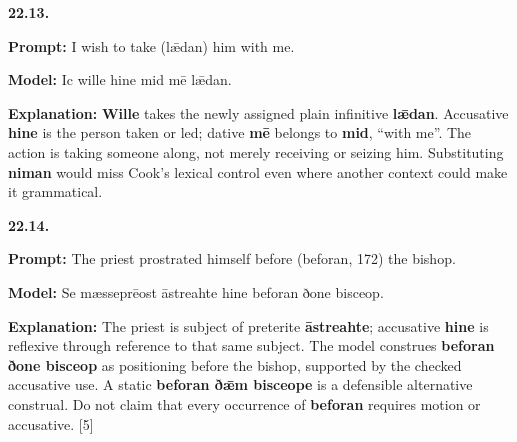\par\begin{minipage}{\linewidth}\raggedright
\textbf{22.13.}

\textbf{Prompt:} I wish to take (lǣdan) him with me.

\textbf{Model:} Ic wille hine mid mē lǣdan.

\textbf{Explanation:} \textbf{Wille} takes the newly assigned plain infinitive \textbf{lǣdan}. Accusative \textbf{hine} is the person taken or led; dative \textbf{mē} belongs to \textbf{mid}, “with me”. The action is taking someone along, not merely receiving or seizing him. Substituting \textbf{niman} would miss Cook’s lexical control even where another context could make it grammatical.

\end{minipage}\par\addvspace{4pt}

\par\begin{minipage}{\linewidth}\raggedright
\textbf{22.14.}

\textbf{Prompt:} The priest prostrated himself before (beforan, 172) the bishop.

\textbf{Model:} Se mæsseprēost āstreahte hine beforan ðone bisceop.

\textbf{Explanation:} The priest is subject of preterite \textbf{āstreahte}; accusative \textbf{hine} is reflexive through reference to that same subject. The model construes \textbf{beforan ðone bisceop} as positioning before the bishop, supported by the checked accusative use. A static \textbf{beforan ðǣm bisceope} is a defensible alternative construal. Do not claim that every occurrence of \textbf{beforan} requires motion or accusative. [5]

\end{minipage}\par\addvspace{4pt}

